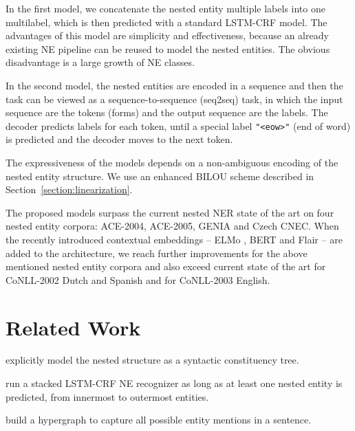 \documentclass[11pt,a4paper]{article}
\newenvironment{citemize}{\begin{list}{}{\topsep=.5\smallskipamount\itemsep=0pt\parsep=1pt\labelwidth=.5em}}{\end{list}}
\begin{document}
\begin{citemize}
  \item In the first model, we concatenate the nested entity multiple labels
    into one multilabel, which is then predicted with a standard LSTM-CRF
    \cite{Lample2016} model. The advantages of this model are simplicity and
    effectiveness, because an already existing NE pipeline can be reused to
    model the nested entities. The obvious disadvantage is a large growth of NE
    classes.
  \item In the second model, the nested entities are encoded in a sequence and
    then the task can be viewed as a sequence-to-sequence (seq2seq) task, in
    which the input sequence are the  tokens (forms) and the output sequence
    are the labels. The decoder predicts labels for each token, until a special
    label \texttt{"<eow>"} (end of word) is predicted and the decoder moves to
    the next token.
\end{citemize}

The expressiveness of the models depends on a non-ambiguous encoding of the
nested entity structure. We use an enhanced BILOU scheme described in
Section~\ref{section:linearization}.

The proposed models surpass the current nested NER state of the art on four
nested entity corpora: ACE-2004, ACE-2005, GENIA and Czech CNEC. When the
recently introduced contextual embeddings -- ELMo \cite{Peters2018}, BERT
\cite{BERT} and Flair \cite{Akbik} -- are added to the architecture, we reach
further improvements for the above mentioned nested entity corpora and also
exceed current state of the art for CoNLL-2002 Dutch and Spanish and for
CoNLL-2003 English.




\section{Related Work}
\label{section:related_work}

\citet{Finkel2009} explicitly model the nested structure as a syntactic
constituency tree.

\citet{Ju2018} run a stacked LSTM-CRF NE recognizer as long as at least one
nested entity is predicted, from innermost to outermost entities.





\citet{Wang2018} build a hypergraph to capture all possible entity mentions in
a sentence.
\end{document}

